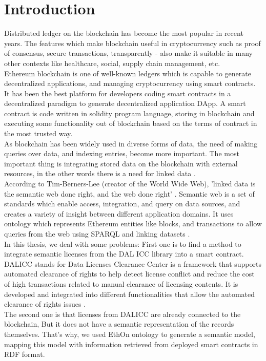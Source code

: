 \section{Introduction}
Distributed ledger on the blockchain has become the most popular in recent years. The features which make blockchain useful in cryptocurrency such as proof of consensus, secure transactions, transparently - also make it suitable in many other contexts like healthcare, social, supply chain management, etc. \\
Ethereum blockchain is one of well-known ledgers which is capable to generate decentralized applications, and managing cryptocurrency using smart contracts. It has been the best platform for developers coding smart contracts in a decentralized paradigm to generate decentralized application DApp.
A smart contract is code written in solidity program language, storing in blockchain and executing some functionality out of blockchain based on the terms of contract in the most trusted way. \\
As blockchain has been widely used in diverse forms of data, the need of making queries over data, and indexing entries, become more important. The most important thing is integrating stored data on the blockchain with external resources, in the other words there is a need for linked data \cite{Third}. \\
According to Tim-Berners-Lee (creator of the World Wide Web), 'linked data is the semantic web done right, and the web done right' \cite{Hector}. 
 Semantic web is a set of standards which enable access, integration, and query on data sources, and creates a variety of insight between different application domains. It uses ontology which represents Ethereum entities like blocks, and transactions to allow queries from the web using SPARQL and linking datasets \cite{Third}. \\
In this thesis, we deal with some problems: First one is to find a method to integrate semantic licenses from the DAL ICC library into a smart contract. 
DALICC stands for Data Licenses Clearance Center is a framework that supports automated clearance of rights to help detect license conflict and reduce the cost of high transactions related to manual clearance of licensing contents.
It is developed and integrated into different functionalities that allow the automated clearance of rights issues \cite{Anna}.\\
The second one is that licenses from DALICC are already connected to the blockchain, But it does not have a semantic representation of the records themselves. That's why, we used EthOn ontology to generate a semantic model, mapping this model with information retrieved from deployed smart contracts in RDF format. 
